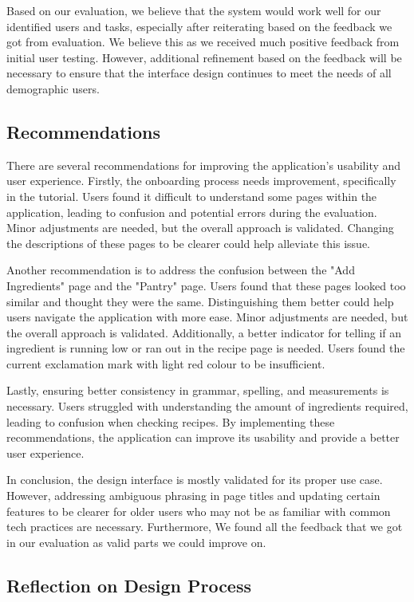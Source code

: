 \documentclass[manuscript, screen, nonacm]{acmart}
\begin{document}
Based on our evaluation, we believe that the system would work well for our identified users and tasks, especially after reiterating based on the feedback we got from evaluation. We believe this as we received much positive feedback from initial user testing. However, additional refinement based on the feedback will be necessary to ensure that the interface design continues to meet the needs of all demographic users.

\subsection{Recommendations}

There are several recommendations for improving the application's usability and user experience. Firstly, the onboarding process needs improvement, specifically in the tutorial. Users found it difficult to understand some pages within the application, leading to confusion and potential errors during the evaluation. Minor adjustments are needed, but the overall approach is validated. Changing the descriptions of these pages to be clearer could help alleviate this issue.

Another recommendation is to address the confusion between the "Add Ingredients" page and the "Pantry" page. Users found that these pages looked too similar and thought they were the same. Distinguishing them better could help users navigate the application with more ease. Minor adjustments are needed, but the overall approach is validated. Additionally, a better indicator for telling if an ingredient is running low or ran out in the recipe page is needed. Users found the current exclamation mark with light red colour to be insufficient.

Lastly, ensuring better consistency in grammar, spelling, and measurements is necessary. Users struggled with understanding the amount of ingredients required, leading to confusion when checking recipes. By implementing these recommendations, the application can improve its usability and provide a better user experience.

In conclusion, the design interface is mostly validated for its proper use case. However, addressing ambiguous phrasing in page titles and updating certain features to be clearer for older users who may not be as familiar with common tech practices are necessary. Furthermore, We found all the feedback that we got in our evaluation as valid parts we could improve on.

\subsection{Reflection on Design Process}
\end{document}
